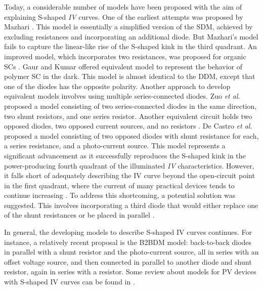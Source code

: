 \documentclass[a4paper,fleqn]{cas-sc}
\begin{document}
Today, a considerable number of models have been proposed with the aim of explaining S-shaped \emph{IV} curves.
One of the earliest attempts was proposed by Mazhari \cite{Mazhari2006}.
This model is essentially a simplified version of the SDM, achieved by excluding resistances and incorporating an additional diode.
But Mazhari's model fails to capture the linear-like rise of the S-shaped kink in the third quadrant. 
An improved model, which incorporates two resistances, was proposed for organic SCs \cite{Yu2019}.
Gaur and Kumar \cite{Gaur2014} offered equivalent model to represent the behavior of polymer SC in the dark.
This model is almost identical to the DDM, except that one of the diodes has the opposite polarity.
Another approach to develop equivalent models involves using multiple series-connected diodes.
Zuo \emph{et al}. \cite{Zuo2014} proposed a model consisting of two series-connected diodes in the same direction, 
two shunt resistors, and one series resistor.
Another equivalent circuit holds two opposed diodes, two opposed current sources, and no resistors \cite{Gao2011}.
De Castro \emph{et al}. \cite{Castro2010} proposed a model consisting of two opposed diodes with shunt resistance for each,
a series resistance, and a photo-current source.
This model represents a significant advancement
as it successfully reproduces the S-shaped kink in the power-producing fourth quadrant
of the illuminated \emph{IV} characteristics.
However, it falls short of adequately describing the IV curve
beyond the open-circuit point in the first quadrant,
where the current of many practical devices tends to continue increasing \cite{SshapeRewShot}.
To address this shortcoming, a potential solution was suggested. 
This involves incorporating a third diode that would either replace one of the shunt resistances \cite{GarciaSanchez2013}
or be placed in parallel \cite{DeCastro2016,Roland2016}.



In general, the developing models to describe S-shaped IV curves continues.
For instance, a relatively recent proposal \cite{Sesa2019} is the B2BDM model:
back-to-back diodes in parallel with a shunt resistor and the photo-current source, all in series with an offset voltage source, and
then connected in parallel to another diode and shunt resistor, again in series with a resistor.
Some review about models for PV devices with S-shaped IV curves can be found in \cite{SshapeRewShot,GarciaSanchez2017}.
\end{document}
